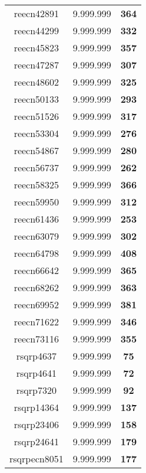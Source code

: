 \begin{tabular}{cc||c}
reecn42891       & 9.999.999        & {\bf 364}       \\ 
reecn44299       & 9.999.999        & {\bf 332}       \\ 
reecn45823       & 9.999.999        & {\bf 357}       \\ 
reecn47287       & 9.999.999        & {\bf 307}       \\ 
reecn48602       & 9.999.999        & {\bf 325}       \\ 
reecn50133       & 9.999.999        & {\bf 293}       \\ 
reecn51526       & 9.999.999        & {\bf 317}       \\ 
reecn53304       & 9.999.999        & {\bf 276}       \\ 
reecn54867       & 9.999.999        & {\bf 280}       \\ 
reecn56737       & 9.999.999        & {\bf 262}       \\ 
reecn58325       & 9.999.999        & {\bf 366}       \\ 
reecn59950       & 9.999.999        & {\bf 312}       \\ 
reecn61436       & 9.999.999        & {\bf 253}       \\ 
reecn63079       & 9.999.999        & {\bf 302}       \\ 
reecn64798       & 9.999.999        & {\bf 408}       \\ 
reecn66642       & 9.999.999        & {\bf 365}       \\ 
reecn68262       & 9.999.999        & {\bf 363}       \\ 
reecn69952       & 9.999.999        & {\bf 381}       \\ 
reecn71622       & 9.999.999        & {\bf 346}       \\ 
reecn73116       & 9.999.999        & {\bf 355}       \\ 
rsqrp4637        & 9.999.999        & {\bf 75}        \\ 
rsqrp4641        & 9.999.999        & {\bf 72}        \\ 
rsqrp7320        & 9.999.999        & {\bf 92}        \\ 
rsqrp14364       & 9.999.999        & {\bf 137}       \\ 
rsqrp23406       & 9.999.999        & {\bf 158}       \\ 
rsqrp24641       & 9.999.999        & {\bf 179}       \\ 
rsqrpecn8051     & 9.999.999        & {\bf 177}       \\ 

\end{tabular}
